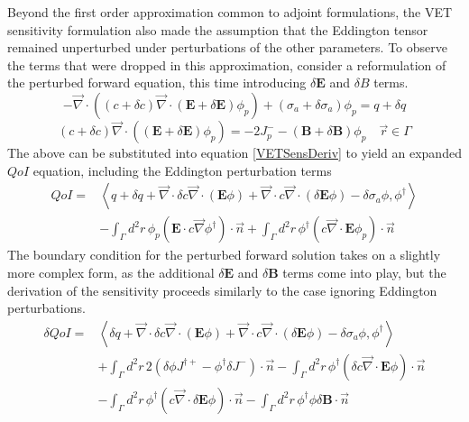 \documentclass{article}
\newcommand{\vr}{\vec{r}}
\newcommand{\bra}{\left\langle}
\newcommand{\ket}{\right\rangle}
\newcommand{\vdiv}{\vec{\nabla} \cdot}
\newcommand{\vgrad}{\vec{\nabla}}
\newcommand{\Edd}{\mathbf{E}}
\newcommand{\BEdd}{\mathbf{B}}
\newcommand{\siga}{\sigma_a}
\newcommand{\isigt}{c}
\newcommand{\scalSource}{q}
\newcommand{\qoi}{QoI}
\begin{document}
Beyond the first order approximation common to adjoint formulations, the VET sensitivity formulation also made the assumption that the Eddington tensor remained unperturbed under perturbations of the other parameters. To observe the terms that were dropped in this approximation, consider a reformulation of the perturbed forward equation, this time introducing $\delta \Edd$ and $\delta  B$ terms. 
\begin{equation}
\label{VEFPerEdd}
- \vdiv \left((\isigt + \delta \isigt)\vdiv (\Edd + \delta \Edd) \phi_p \right) + (\siga + \delta \siga)\phi_p = \scalSource + \delta \scalSource
\end{equation}
\begin{equation}
(\isigt + \delta \isigt) \vec{\nabla} \cdot \left((\Edd + \delta \Edd) \phi_p \right)  = - 2J_p^- - (\BEdd +\delta \BEdd) \phi_p \quad \vr \in \Gamma
\end{equation}
The above can be substituted into equation \ref{VETSensDeriv} to yield an expanded $\qoi$ equation, including the Eddington perturbation terms
\begin{equation}
\label{QoIVETAdjNoBCEdd}
\begin{split}
\qoi =& \bra \scalSource + \delta \scalSource + \vdiv \delta \isigt \vdiv \left( \Edd \phi \right) + \vdiv \isigt \vdiv \left( \delta \Edd \phi \right) - \delta \siga \phi, \phi^\dag \ket \\
&- \int_\Gamma d^2 r \, \phi_p \left( \Edd \cdot \isigt \vgrad \phi^\dag \right) \cdot \vec{n} 
+ \int_\Gamma d^2 r \, \phi^\dag \left(  \isigt \vdiv \Edd \phi_p \right) \cdot \vec{n} 
\end{split}
\end{equation}
The boundary condition for the perturbed forward solution takes on a slightly more complex form, as the additional $\delta \Edd$ and $\delta \BEdd$ terms come into play, but the derivation of the sensitivity proceeds similarly to the case ignoring Eddington perturbations.
\begin{equation}
\label{QoIVETAdjEdd}
\begin{split}
\delta \qoi =& \bra \delta \scalSource + \vdiv \delta \isigt \vdiv \left( \Edd \phi \right) + \vdiv \isigt \vdiv \left( \delta \Edd \phi \right) - \delta \siga \phi, \phi^\dag \ket \\
&+ \int_\Gamma d^2 r \, 2  \left( \delta \phi J^{\dag +}  - \phi^\dag \delta J^- \right) \cdot \vec{n}
- \int_\Gamma d^2 r \,  \phi^\dag \left( \delta \isigt \vdiv \Edd \phi \right) \cdot \vec{n}
\\
&- \int_\Gamma d^2 r \,  \phi^\dag \left( \isigt \vdiv \delta \Edd \phi \right) \cdot \vec{n}
- \int_\Gamma d^2 r \,  \phi^\dag \phi \delta \BEdd \cdot \vec{n}
\end{split}
\end{equation} 
\end{document}
